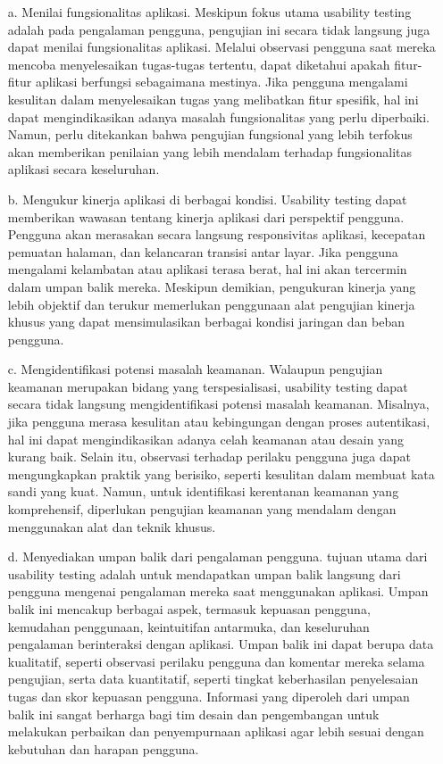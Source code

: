 \documentclass[a4paper, 12pt]{article}
\begin{document}
\begin{itemize}[leftmargin=*]
\item[a.] Menilai fungsionalitas aplikasi. Meskipun fokus utama usability testing adalah pada pengalaman pengguna, pengujian ini secara tidak langsung juga dapat menilai fungsionalitas aplikasi. Melalui observasi pengguna saat mereka mencoba menyelesaikan tugas-tugas tertentu, dapat diketahui apakah fitur-fitur aplikasi berfungsi sebagaimana mestinya. Jika pengguna mengalami kesulitan dalam menyelesaikan tugas yang melibatkan fitur spesifik, hal ini dapat mengindikasikan adanya masalah fungsionalitas yang perlu diperbaiki. Namun, perlu ditekankan bahwa pengujian fungsional yang lebih terfokus akan memberikan penilaian yang lebih mendalam terhadap fungsionalitas aplikasi secara keseluruhan.
\item[b.] Mengukur kinerja aplikasi di berbagai kondisi. Usability testing dapat memberikan wawasan tentang kinerja aplikasi dari perspektif pengguna. Pengguna akan merasakan secara langsung responsivitas aplikasi, kecepatan pemuatan halaman, dan kelancaran transisi antar layar. Jika pengguna mengalami kelambatan atau aplikasi terasa berat, hal ini akan tercermin dalam umpan balik mereka. Meskipun demikian, pengukuran kinerja yang lebih objektif dan terukur memerlukan penggunaan alat pengujian kinerja khusus yang dapat mensimulasikan berbagai kondisi jaringan dan beban pengguna.
\item[c.] Mengidentifikasi potensi masalah keamanan. Walaupun pengujian keamanan merupakan bidang yang terspesialisasi, usability testing dapat secara tidak langsung mengidentifikasi potensi masalah keamanan. Misalnya, jika pengguna merasa kesulitan atau kebingungan dengan proses autentikasi, hal ini dapat mengindikasikan adanya celah keamanan atau desain yang kurang baik. Selain itu, observasi terhadap perilaku pengguna juga dapat mengungkapkan praktik yang berisiko, seperti kesulitan dalam membuat kata sandi yang kuat. Namun, untuk identifikasi kerentanan keamanan yang komprehensif, diperlukan pengujian keamanan yang mendalam dengan menggunakan alat dan teknik khusus.
\item[d.] Menyediakan umpan balik dari pengalaman pengguna. tujuan utama dari usability testing adalah untuk mendapatkan umpan balik langsung dari pengguna mengenai pengalaman mereka saat menggunakan aplikasi. Umpan balik ini mencakup berbagai aspek, termasuk kepuasan pengguna, kemudahan penggunaan, keintuitifan antarmuka, dan keseluruhan pengalaman berinteraksi dengan aplikasi. Umpan balik ini dapat berupa data kualitatif, seperti observasi perilaku pengguna dan komentar mereka selama pengujian, serta data kuantitatif, seperti tingkat keberhasilan penyelesaian tugas dan skor kepuasan pengguna. Informasi yang diperoleh dari umpan balik ini sangat berharga bagi tim desain dan pengembangan untuk melakukan perbaikan dan penyempurnaan aplikasi agar lebih sesuai dengan kebutuhan dan harapan pengguna.
\end{itemize}
\end{document}
